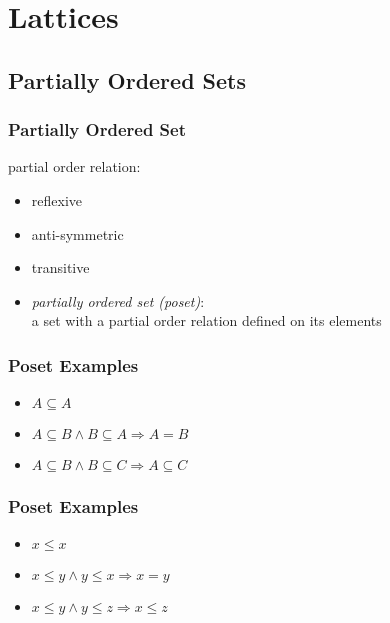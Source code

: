 \documentclass[dvipsnames]{beamer}
\begin{document}
\section{Lattices}

\subsection{Partially Ordered Sets}

\begin{frame}
  \frametitle{Partially Ordered Set}

  \begin{definition}
    \alert{partial order relation}:
    \begin{itemize}
      \item reflexive
      \item anti-symmetric
      \item transitive
    \end{itemize}
  \end{definition}

  \pause
  \begin{itemize}
    \item \emph{partially ordered set (poset)}:\\
      a set with a partial order relation defined on its elements
  \end{itemize}
\end{frame}

\begin{frame}
  \frametitle{Poset Examples}

  \begin{example}
    \begin{itemize}
      \item $A \subseteq A$
      \item $A \subseteq B \wedge B \subseteq A \Rightarrow A = B$
      \item $A \subseteq B \wedge B \subseteq C \Rightarrow A \subseteq C$
    \end{itemize}
  \end{example}
\end{frame}

\begin{frame}
  \frametitle{Poset Examples}

  \begin{example}
    \begin{itemize}
      \item $x \leq x$
      \item $x \leq y \wedge y \leq x \Rightarrow x = y$
      \item $x \leq y \wedge y \leq z \Rightarrow x \leq z$
    \end{itemize}
  \end{example}
\end{frame}
\end{document}
